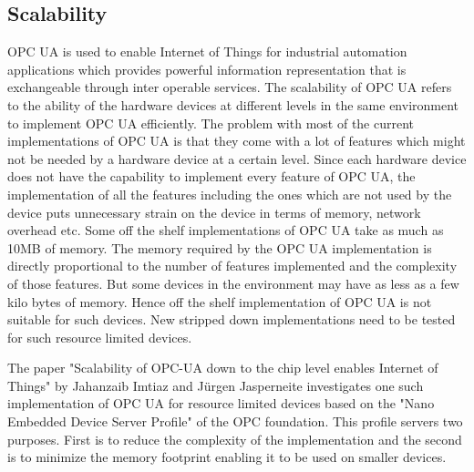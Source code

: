 \documentclass[conference]{IEEEtran}
\begin{document}
\subsection{Scalability}
OPC UA is used to enable Internet of Things for industrial automation applications which provides powerful information representation that is exchangeable through inter operable services. The scalability of OPC UA refers to the ability of the hardware devices at different levels in the same environment to implement OPC UA efficiently. The problem with most of the current implementations of OPC UA is that they come with a lot of features which might not be needed by a hardware device at a certain level. Since each hardware device does not have the capability to implement every feature of OPC UA, the implementation  of all the features including the ones which are not used by the device puts unnecessary strain on the device in terms of memory, network overhead etc. 
Some off the shelf implementations of OPC UA take as much as 10MB of memory. \cite{6622935} The memory required by the OPC UA implementation is directly proportional to the number of features implemented and the complexity of those features. But some devices in the environment may have as less as a few kilo bytes of memory. Hence off the shelf implementation of OPC UA is not suitable for such devices. New stripped down implementations need to be tested for such resource limited devices. 

The paper "Scalability of OPC-UA down to the chip level enables Internet of Things" by Jahanzaib Imtiaz and Jürgen Jasperneite investigates one such implementation of OPC UA for resource limited devices based on the "Nano Embedded Device Server Profile" of the OPC foundation. This profile servers two purposes. First is to reduce the complexity of the implementation and the second is to minimize the memory footprint enabling it to be used on smaller devices. \cite{6622935}
\end{document}
